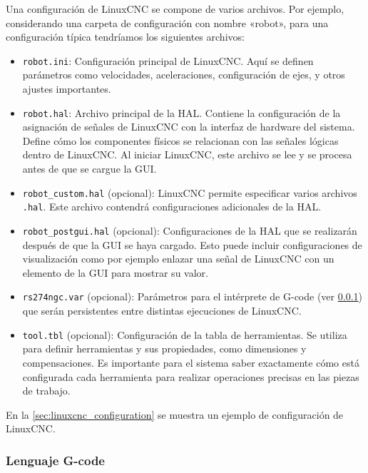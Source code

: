 \documentclass[english,spanish,a4paper,11pt]{article}
\begin{document}
Una configuración de LinuxCNC se compone de varios archivos. Por ejemplo, considerando una carpeta de configuración con nombre «robot», para una configuración típica tendríamos los siguientes archivos:
%
\begin{itemize}
    \item \texttt{robot.ini}: Configuración principal de LinuxCNC. Aquí se definen parámetros como velocidades, aceleraciones, configuración de ejes, y otros ajustes importantes.

    \item \texttt{robot.hal}: Archivo principal de la \acf{HAL}. Contiene la configuración de la asignación de señales de LinuxCNC con la interfaz de hardware del sistema. Define cómo los componentes físicos se relacionan con las señales lógicas dentro de LinuxCNC. Al iniciar LinuxCNC, este archivo se lee y se procesa antes de que se cargue la \ac{GUI}.

    \item \texttt{robot\_custom.hal} (opcional): LinuxCNC permite especificar varios archivos \texttt{.hal}. Este archivo contendrá  configuraciones adicionales de la \acl{HAL}.

    \item \texttt{robot\_postgui.hal} (opcional): Configuraciones de la \acl{HAL} que se realizarán después de que la \ac{GUI} se haya cargado. Esto puede incluir configuraciones de visualización como por ejemplo enlazar una señal de LinuxCNC con un elemento de la \ac{GUI} para mostrar su valor.

    \item \texttt{rs274ngc.var} (opcional): Parámetros para el intérprete de G-code (ver \cref{sec:linuxcnc_intro_gcode}) que serán persistentes entre distintas ejecuciones de LinuxCNC.

    \item \texttt{tool.tbl} (opcional): Configuración de la tabla de herramientas. Se utiliza para definir herramientas y sus propiedades, como dimensiones y compensaciones. Es importante para el sistema saber exactamente cómo está configurada cada herramienta para realizar operaciones precisas en las piezas de trabajo.
\end{itemize}

En la \cref{sec:linuxcnc_configuration} se muestra un ejemplo de configuración de LinuxCNC.


\subsubsection{Lenguaje G-code}
\label{sec:linuxcnc_intro_gcode}
\end{document}
